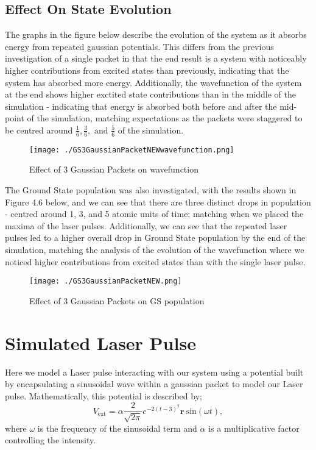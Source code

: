 \subsection{Effect On State Evolution}
The graphs in the figure below describe the evolution of the system as it absorbs energy from repeated gaussian potentials. This differs from the previous investigation of a single packet in that the end result is a system with noticeably higher contributions from excited states than previously, indicating that the system has absorbed more energy. Additionally, the wavefunction of the system at the end shows higher exctited state contributions than in the middle of the simulation - indicating that energy is absorbed both before and after the mid-point of the simulation, matching expectations as the packets were staggered to be centred around $\frac{1}{6}, \frac{3}{6}, \text{ and }\frac{5}{6}$ of the simulation.
\begin{figure}[H]
          \texttt{[image: ./GS3GaussianPacketNEWwavefunction.png]}
          \centering
          \caption{Effect of 3 Gaussian Packets on wavefunction}
\end{figure}

The Ground State population was also investigated, with the results shown in Figure 4.6 below, and we can see that there are three distinct drops in population - centred around 1, 3, and 5 atomic units of time; matching when we placed the maxima of the laser pulses. Additionally, we can see that the repeated laser pulses led to a higher overall drop in Ground State population by the end of the simulation, matching the analysis of the evolution of the wavefunction where we noticed higher contributions from excited states than with the single laser pulse.
\begin{figure}[H]
          \texttt{[image: ./GS3GaussianPacketNEW.png]}
          \centering
          \caption{Effect of 3 Gaussian Packets on GS population}
\end{figure}

\section{Simulated Laser Pulse}

Here we model a Laser pulse interacting with our system using a potential built by encapsulating a sinusoidal wave within a gaussian packet to model our Laser pulse. Mathematically, this potential is described by;
$$
V_{\text{ext}} = \alpha \frac{2}{\sqrt{2\pi}}e^{-2\left(t-3\right)^{2}}\mathbf{r}\ \text{sin}\left(\omega t\right),
$$
where $\omega$ is the frequency of the sinusoidal term and $\alpha$ is a multiplicative factor controlling the intensity.


